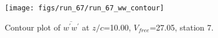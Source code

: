 \begin{figure}[H]
\centering
\texttt{[image: figs/run\_67/run\_67\_ww\_contour]}
\caption{Contour plot of $\overline{w^\prime w^\prime}$ at $z/c$=10.00, $V_{free}$=27.05, station 7.}
\end{figure}


